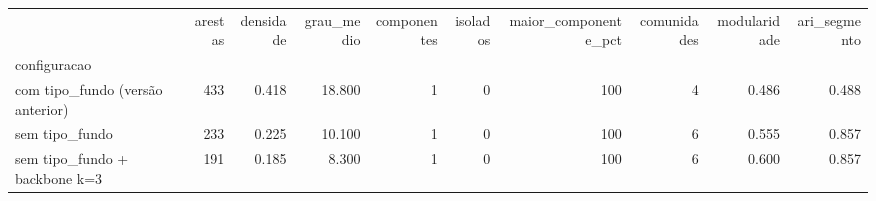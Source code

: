 \begin{tabular}{lrrrrrrrrr}
\toprule
 & arestas & densidade & grau\_medio & componentes & isolados & maior\_componente\_pct & comunidades & modularidade & ari\_segmento \\
configuracao &  &  &  &  &  &  &  &  &  \\
\midrule
com tipo\_fundo (versão anterior) & 433 & 0.418 & 18.800 & 1 & 0 & 100 & 4 & 0.486 & 0.488 \\
sem tipo\_fundo & 233 & 0.225 & 10.100 & 1 & 0 & 100 & 6 & 0.555 & 0.857 \\
sem tipo\_fundo + backbone k=3 & 191 & 0.185 & 8.300 & 1 & 0 & 100 & 6 & 0.600 & 0.857 \\
\bottomrule
\end{tabular}

